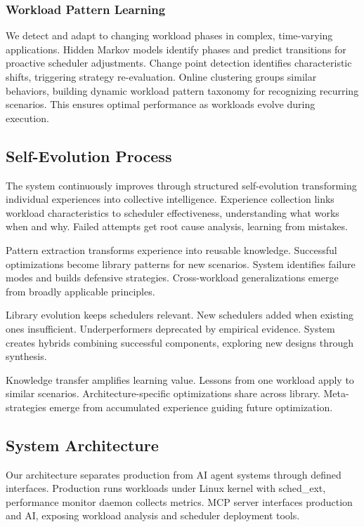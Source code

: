 \subsubsection{Workload Pattern Learning}
We detect and adapt to changing workload phases in complex, time-varying applications. Hidden Markov models identify phases and predict transitions for proactive scheduler adjustments. Change point detection identifies characteristic shifts, triggering strategy re-evaluation. Online clustering groups similar behaviors, building dynamic workload pattern taxonomy for recognizing recurring scenarios. This ensures optimal performance as workloads evolve during execution.

\subsection{Self-Evolution Process}

The system continuously improves through structured self-evolution transforming individual experiences into collective intelligence. Experience collection links workload characteristics to scheduler effectiveness, understanding what works when and why. Failed attempts get root cause analysis, learning from mistakes.

Pattern extraction transforms experience into reusable knowledge. Successful optimizations become library patterns for new scenarios. System identifies failure modes and builds defensive strategies. Cross-workload generalizations emerge from broadly applicable principles.

Library evolution keeps schedulers relevant. New schedulers added when existing ones insufficient. Underperformers deprecated by empirical evidence. System creates hybrids combining successful components, exploring new designs through synthesis.

Knowledge transfer amplifies learning value. Lessons from one workload apply to similar scenarios. Architecture-specific optimizations share across library. Meta-strategies emerge from accumulated experience guiding future optimization.

\subsection{System Architecture}

Our architecture separates production from AI agent systems through defined interfaces. Production runs workloads under Linux kernel with sched\_ext, performance monitor daemon collects metrics. MCP server interfaces production and AI, exposing workload analysis and scheduler deployment tools.


